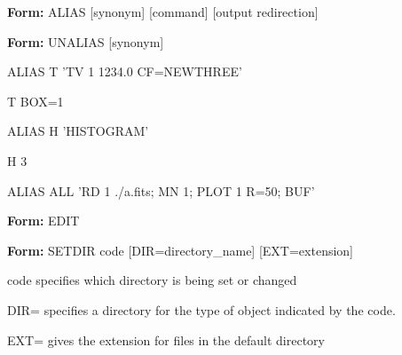 {\newpage\clearpage
{}%
\begin{command}
  \item[\textbf{Form: }ALIAS {[synonym]} {[command]} {[output
       redirection]}\hfill]{} 
  \item[\textbf{Form: }UNALIAS {[synonym]}\hfill]{}
\end{command}%
\lthtmlfigureZ
\lthtmlcheckvsize\clearpage}

{\newpage\clearpage
{}%
\begin{hanging}
  \item{ALIAS T 'TV 1 1234.0 CF=NEWTHREE'}
\end{hanging}%
\lthtmlfigureZ
\lthtmlcheckvsize\clearpage}

{\newpage\clearpage
{}%
\begin{hanging}
  \item{T BOX=1}
\end{hanging}%
\lthtmlfigureZ
\lthtmlcheckvsize\clearpage}

{\newpage\clearpage
{}%
\begin{hanging}
  \item{ALIAS H 'HISTOGRAM'}
\end{hanging}%
\lthtmlfigureZ
\lthtmlcheckvsize\clearpage}

{\newpage\clearpage
{}%
\begin{hanging}
  \item{H 3\hfill}
\end{hanging}%
\lthtmlfigureZ
\lthtmlcheckvsize\clearpage}

{\newpage\clearpage
{}%
\begin{hanging}
  \item{ALIAS ALL 'RD 1 ./a.fits; MN 1; PLOT 1 R=50; BUF'}
\end{hanging}%
\lthtmlfigureZ
\lthtmlcheckvsize\clearpage}

{\newpage\clearpage
{}%
\begin{command}
  \item[\textbf{Form: }EDIT\hfill]{}
\end{command}%
\lthtmlfigureZ
\lthtmlcheckvsize\clearpage}

{\newpage\clearpage
{}%
\begin{command}
  \item[\textbf{Form: } SETDIR code {[DIR=directory\_name]} 
       {[EXT=extension]}\hfill]{}
  \item[code]{specifies which directory is being set or changed}
  \item[DIR= ]{   specifies a directory for the type of object
       indicated by the code.}
  \item[EXT=]{gives the extension for files in the default directory}
\end{command}%
\lthtmlfigureZ
\lthtmlcheckvsize\clearpage}

